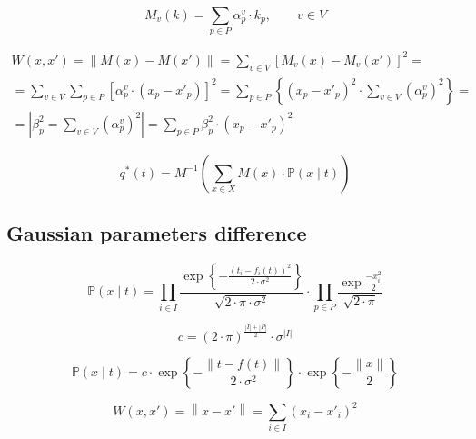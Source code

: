 \begin{equation*}
  M_v\left( k \right) = \sum_{p \in P} \alpha_p^v \cdot k_p, \qquad v \in V
\end{equation*}

\begin{equation*}
    \begin{split}
      W \left( x, x' \right)
      = \left\| M\left( x \right) - M\left( x' \right) \right\|
      = \sum_{v \in V} \left[
          M_v\left( x \right) - M_v\left( x' \right)
        \right]^2 = \\
      = \sum_{v \in V} \sum_{p \in P} \left[
          \alpha_p^v \cdot \left( x_p - x'_p \right)
        \right]^2
      = \sum_{p \in P} \left\{ \left( x_p - x'_p \right)^2
        \cdot \sum_{v \in V} \left( \alpha_p^v \right)^2 \right\} = \\
      = \left| \beta_p^2 = \sum_{v \in V} \left( \alpha_p^v \right)^2 \right|
      = \sum_{p \in P}
          \beta_p^2 \cdot \left( x_p - x'_p \right)^2
    \end{split}
\end{equation*}

\begin{equation*}
  q^* \left( t \right)
  = M^{-1} \left(
      \sum_{x \in X} M\left( x \right) \cdot \mathbb{P}\left( x \mid t \right)
    \right)
\end{equation*}

\subsection{Gaussian parameters difference}

\begin{equation*}
  \mathbb{P}\left( x \mid t \right)
  = \prod_{i \in I}
    \frac{\exp{\left\{- \frac{\left( t_i - f_i\left( t \right) \right)^2}
         {2 \cdot \sigma^2} \right\}}}{\sqrt{2 \cdot \pi \cdot \sigma^2}}
    \cdot
    \prod_{p \in P}
    \frac{\exp{\frac{-x_i^2}{2}}}{\sqrt{2 \cdot \pi}}
\end{equation*}

\begin{equation*}
  c = \left( 2 \cdot \pi \right)^{\frac{\left| I \right| + \left| P \right|}{2}}
      \cdot \sigma^{\left| I \right|}
\end{equation*}

\begin{equation*}
    \mathbb{P}\left( x \mid t \right)
    = c
      \cdot \exp{\left\{ - \frac{\left\| t - f\left( t \right) \right\|}
                                {2 \cdot \sigma^2} \right\}}
      \cdot \exp{\left\{ - \frac{\left\| x \right\|}{2} \right\}}
\end{equation*}

\begin{equation*}
  W \left( x, x' \right)
  = \left\| x - x' \right\|
  = \sum_{i \in I} \left( x_i - x'_i \right)^2
\end{equation*}
